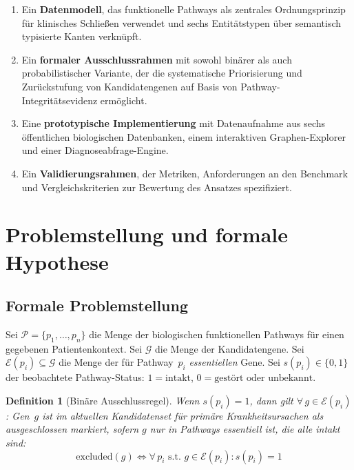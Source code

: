 \documentclass[12pt,a4paper]{article}
\newtheorem{definition}{Definition}
\begin{document}
\begin{enumerate}
    \item Ein \textbf{Datenmodell}, das funktionelle Pathways als zentrales Ordnungsprinzip für klinisches Schließen verwendet und sechs Entitätstypen über semantisch typisierte Kanten verknüpft.
    \item Ein \textbf{formaler Ausschlussrahmen} mit sowohl binärer als auch probabilistischer Variante, der die systematische Priorisierung und Zurückstufung von Kandidatengenen auf Basis von Pathway-Integritätsevidenz ermöglicht.
    \item Eine \textbf{prototypische Implementierung} mit Datenaufnahme aus sechs öffentlichen biologischen Datenbanken, einem interaktiven Graphen-Explorer und einer Diagnoseabfrage-Engine.
    \item Ein \textbf{Validierungsrahmen}, der Metriken, Anforderungen an den Benchmark und Vergleichskriterien zur Bewertung des Ansatzes spezifiziert.
\end{enumerate}

\section{Problemstellung und formale Hypothese}
\label{sec:problem}

\subsection{Formale Problemstellung}

Sei $\mathcal{P} = \{p_1, \ldots, p_n\}$ die Menge der biologischen funktionellen Pathways für einen gegebenen Patientenkontext. Sei $\mathcal{G}$ die Menge der Kandidatengene. Sei $\mathcal{E}(p_i) \subseteq \mathcal{G}$ die Menge der für Pathway~$p_i$ \emph{essentiellen} Gene. Sei $s(p_i) \in \{0, 1\}$ der beobachtete Pathway-Status: $1 = \text{intakt}$, $0 = \text{gestört oder unbekannt}$.

\begin{definition}[Binäre Ausschlussregel]
\label{def:binary}
Wenn $s(p_i) = 1$, dann gilt $\forall\, g \in \mathcal{E}(p_i)$: Gen~$g$ ist im aktuellen Kandidatenset für primäre Krankheitsursachen als \emph{ausgeschlossen} markiert, sofern $g$ nur in Pathways essentiell ist, die alle intakt sind:
\begin{equation}
    \text{excluded}(g) \iff \forall\, p_i \text{ s.t. } g \in \mathcal{E}(p_i): s(p_i) = 1
\end{equation}
\end{definition}
\end{document}
